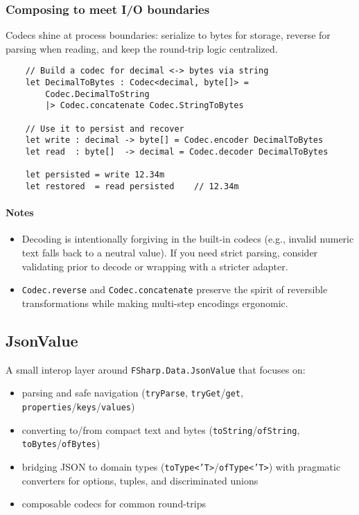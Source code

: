 \documentclass{article}
\begin{document}
\subsubsection{Composing to meet I/O boundaries}
Codecs shine at process boundaries: serialize to bytes for storage, reverse for parsing when reading, and keep the round-trip logic centralized.
\begin{verbatim}
    // Build a codec for decimal <-> bytes via string
    let DecimalToBytes : Codec<decimal, byte[]> =
        Codec.DecimalToString
        |> Codec.concatenate Codec.StringToBytes

    // Use it to persist and recover
    let write : decimal -> byte[] = Codec.encoder DecimalToBytes
    let read  : byte[]  -> decimal = Codec.decoder DecimalToBytes

    let persisted = write 12.34m
    let restored  = read persisted    // 12.34m
\end{verbatim}

\paragraph{Notes}
\begin{itemize}
  \item Decoding is intentionally forgiving in the built-in codecs (e.g., invalid numeric text falls back to a neutral value). If you need strict parsing, consider validating prior to decode or wrapping with a stricter adapter.
  \item \texttt{Codec.reverse} and \texttt{Codec.concatenate} preserve the spirit of reversible transformations while making multi-step encodings ergonomic.
\end{itemize}

\subsection{JsonValue}

\noindent A small interop layer around \texttt{FSharp.Data.JsonValue} that focuses on:
\begin{itemize}
  \item parsing and safe navigation (\texttt{tryParse}, \texttt{tryGet}/\texttt{get}, \texttt{properties}/\texttt{keys}/\texttt{values})
  \item converting to/from compact text and bytes (\texttt{toString}/\texttt{ofString}, \texttt{toBytes}/\texttt{ofBytes})
  \item bridging JSON to domain types (\texttt{toType<'T>}/\texttt{ofType<'T>}) with pragmatic converters for options, tuples, and discriminated unions
  \item composable codecs for common round-trips
\end{itemize}
\end{document}
